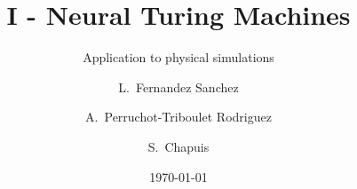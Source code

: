 \documentclass{beamer}
\title{I - Neural Turing Machines}
\subtitle{Application to physical simulations}
\author[Lucia Fernandez Sanchez, Alexandra Perruchot-Triboulet Rodriguez, Samuel Chapuis]{L.~Fernandez Sanchez \and A.~Perruchot-Triboulet Rodriguez \and S.~Chapuis}
\date{\today}
\begin{document}
\frame{\titlepage}









    

   
        

    


    
\end{document}
